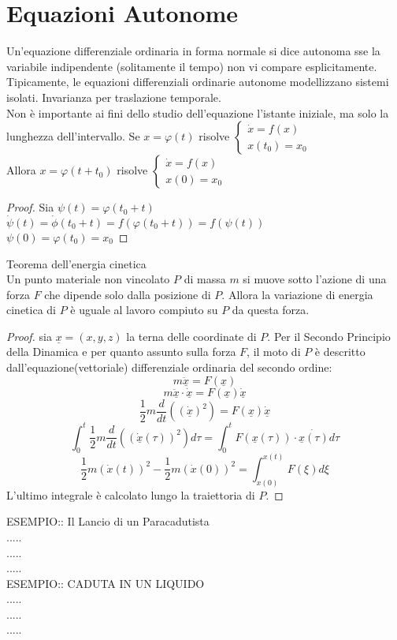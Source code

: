 \section{Equazioni Autonome}
Un'equazione differenziale ordinaria in forma normale si dice autonoma sse la variabile indipendente (solitamente il tempo) non vi compare esplicitamente.
\observation
Tipicamente, le equazioni differenziali ordinarie autonome modellizzano sistemi isolati.
\observation Invarianza per traslazione temporale.\\
Non è importante ai fini dello studio dell'equazione l'istante iniziale, ma solo la lunghezza dell'intervallo.
Se  $x=\varphi(t)$ risolve $\left\{ \begin{matrix} \dot{x} = f(x)\\x(t_0)=x_0 \end{matrix} \right.$\\
Allora $x=\varphi(t+t_0)$ risolve $\left\{ \begin{matrix} \dot{x} = f(x)\\x(0)=x_0 \end{matrix} \right.$\\
\begin{proof}
	Sia $\psi(t)=\varphi(t_0+t)$\\
	$\dot{\psi}(t)=\dot{\phi}(t_0+t)=f(\varphi(t_0+t))=f(\psi(t))$\\
	$\psi(0)=\varphi(t_0)=x_0$ 
\end{proof}
\proposition Teorema dell'energia cinetica\\
Un punto materiale non vincolato $P$ di massa $m$ si muove sotto l'azione di una forza $F$ che dipende solo dalla posizione di $P$. Allora la variazione di energia cinetica di $P$ è uguale al lavoro compiuto su $P$ da questa forza.
\begin{proof}
	sia $\underline{x}=(x,y,z)$ la terna delle coordinate di $P$. Per il Secondo Principio della Dinamica e per quanto assunto sulla forza $F$, il moto di $P$ è descritto dall'equazione(vettoriale) differenziale ordinaria del secondo ordine:\\
	$$m\ddot{\underline{x}}=F(\underline{x})$$
	$$m\ddot{\underline{x}}\cdot\dot{\underline{x}}=F(\underline{x})\dot{\underline{x}}$$
	$$\frac{1}{2}m\frac{d}{dt}\left(\left(\dot{\underline{x}}\right)^2\right)=F(\underline{x})\dot{\underline{x}}$$
	$$\int_{0}^t\frac{1}{2}m\frac{d}{dt}\left(\left(\dot{\underline{x}}(\tau)\right)^2\right)d\tau=\int_{0}^tF(\underline{x}(\tau))\cdot\dot{\underline{x}(\tau)}d\tau$$
	$$\frac{1}{2}m\left(\dot{x}(t)\right)^2-\frac{1}{2}m\left(\dot{x}(0)\right)^2 = \int_{x(0)}^{x(t)}F(\xi)d\xi$$
	L'ultimo integrale è calcolato lungo la traiettoria di $P$.
\end{proof}
ESEMPIO:: Il Lancio di un Paracadutista\\
.....\\
.....\\
.....\\
ESEMPIO:: CADUTA IN UN LIQUIDO\\
.....\\
.....\\
.....\\
